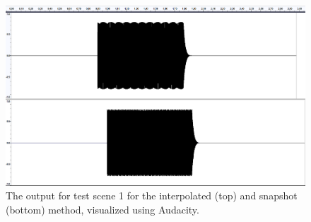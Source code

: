 \begin{figure}[t!]
    \begin{center}
        \includegraphics{images/approach-waves.png}
    \end{center}
    \caption[Visualization of the outputs for test scene 1]{The output for test scene 1 for the interpolated (top) and snapshot (bottom) method, visualized using Audacity.}\label{fig:ApproachWaves}
\end{figure}

